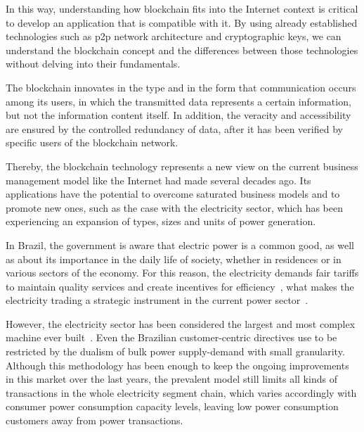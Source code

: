 In this way, understanding how blockchain fits into the Internet context is critical to develop an application that is compatible with it.
By using already established technologies such as \gls{p2p} network architecture and cryptographic keys,
we can understand the blockchain concept and the differences between those technologies without delving into their fundamentals.

The blockchain innovates in the type and in the form that communication occurs among its users, in which the transmitted data represents a certain information, but not the information content itself.
In addition, the veracity and accessibility are ensured by the controlled redundancy of data,
after it has been verified by specific users of the blockchain network.

Thereby, the blockchain technology represents a new view on the current business management model like the Internet had made several decades ago.
Its applications have the potential to overcome saturated business models and to promote new ones, such as the case with the electricity sector, which has been experiencing an expansion of types, sizes and units of power generation.

In Brazil, the government is aware that electric power is a common good, as well as about its importance in the daily life of society, whether in residences or in various sectors of the economy.
For this reason, the electricity demands fair tariffs
to maintain quality services and create incentives for efficiency~\cite{tarifas},
what makes the electricity trading a strategic instrument in the current power sector~\cite{modeloBR}.

However, the electricity sector has been considered the largest and most complex machine ever built~\cite{ClarkWGellings2009-SmartGrid-char1}.
Even the Brazilian customer-centric directives use to be restricted by the dualism of bulk power supply-demand with small granularity.
Although
this methodology has been
enough to keep the ongoing improvements in this market over the last years,
the prevalent model still limits all kinds of transactions in the whole electricity segment chain,
which varies accordingly with consumer power consumption capacity levels, leaving low power consumption customers away from power transactions.

